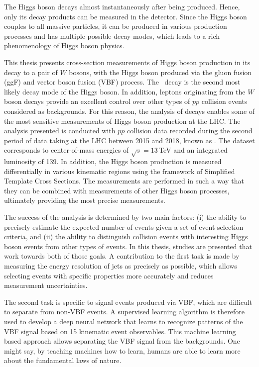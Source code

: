 The Higgs boson decays almost instantaneously after being produced. Hence, only its decay products can be measured in the detector. Since the Higgs boson couples to all massive particles, it can be produced in various production processes and has multiple possible decay modes, which leads to a rich phenomenology of Higgs boson physics. 

This thesis presents cross-section measurements of Higgs boson production in its decay to a pair of $W$ bosons, with the Higgs boson produced via the gluon fusion (ggF) and vector boson fusion (VBF) process.
The \HWW\ decay is the second most likely decay mode of the Higgs boson. In addition, leptons originating from the $W$ boson decays provide an excellent control over other types of $pp$ collision events considered as backgrounds.
For this reason, the analysis of \HWWdet decays enables some of the most sensitive measurements of Higgs boson production at the LHC.
The \HWWdet analysis presented is conducted with $pp$ collision data recorded during the second period of data taking at the LHC between 2015 and 2018, known as \RunTwo. The dataset corresponds to center-of-mass energies of $\sqrt{s} = 13\,$TeV and an integrated luminosity of 139\ifb.
In addition, the Higgs boson production is measured differentially in various kinematic regions using the framework of Simplified Template Cross Sections. 
The measurements are performed in such a way that they can be combined with measurements of other Higgs boson processes, ultimately providing the most precise measurements.

The success of the \HWWdet analysis is determined by two main factors: 
(i) the ability to precisely estimate the expected number of events given a set of event selection criteria, and (ii) the ability to distinguish collision events with interesting Higgs boson events from other types of events.
In this thesis, studies are presented that work towards both of those goals.
A contribution to the first task is made by measuring the energy resolution of jets as precisely as possible, which allows selecting events with specific properties more accurately and reduces measurement uncertainties.

The second task is specific to \HWWdet signal events produced via VBF, which are difficult to separate from non-VBF events. 
A supervised learning algorithm is therefore used to develop a deep neural network that learns to recognize patterns of the VBF signal based on 15 kinematic event observables. 
This machine learning based approach allows separating the VBF signal from the backgrounds.
One might say, by teaching machines how to learn, humans are able to learn more about the fundamental laws of nature. 



